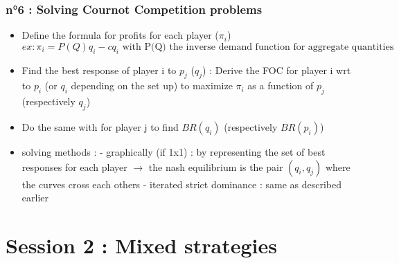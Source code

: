\documentclass{article}
\begin{document}
\subsubsection{n°6 : Solving Cournot Competition problems}
\begin{itemize}
    \item Define the formula for profits for each player ($\pi_i$)
\begin{equation}
    ex : \pi_i=P(Q)q_i-cq_i \text{ with P(Q) the inverse demand function for aggregate quantities}
\end{equation}
    \item Find the best response of player i to $p_j$ ($q_j$) : Derive the FOC for player i wrt to $p_i$ (or $q_i$ depending on the set up) to maximize $\pi_i$ as a function of $p_j$ (respectively $q_j$)
    \item Do the same with for player j to find $BR(q_i)$ (respectively $BR(p_i)$)
    \item solving methods : 
        \subitem - graphically (if 1x1) : by representing the set of best responses for each player $\rightarrow$ the nash equilibrium is the pair $(q_i,q_j)$ where the curves cross each others
        \subitem - iterated strict dominance : same as described earlier 
\end{itemize}

\section{Session 2 : Mixed strategies}
\end{document}
